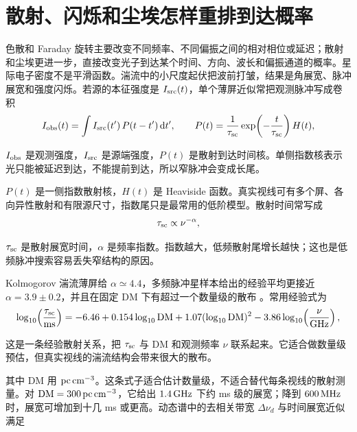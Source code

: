 \section{散射、闪烁和尘埃怎样重排到达概率}

色散和 Faraday 旋转主要改变不同频率、不同偏振之间的相对相位或延迟；散射和尘埃更进一步，直接改变光子到达某个时间、方向、波长和偏振通道的概率。星际电子密度不是平滑函数。湍流中的小尺度起伏把波前打皱，结果是角展宽、脉冲展宽和强度闪烁。若源的本征强度是 \(I_{\rm src}(t)\)，单个薄屏近似常把观测脉冲写成卷积
\begin{equation}
  I_{\rm obs}(t)
  =
  \int I_{\rm src}(t')\,P(t-t')\,{\rm d}t',
  \qquad
  P(t)=\frac{1}{\tau_{\rm sc}}\exp\!\left(-\frac{t}{\tau_{\rm sc}}\right)H(t),
  \label{eq:ch14-scattering-convolution}
\end{equation}
\begin{formulaexplain}[公式 (14.12) 解读]
\(I_{\rm obs}\) 是观测强度，\(I_{\rm src}\) 是源端强度，\(P(t)\) 是散射到达时间核。单侧指数核表示光只能被延迟到达，不能提前到达，所以窄脉冲会变成长尾。
\end{formulaexplain}
\(P(t)\) 是一侧指数散射核，\(H(t)\) 是 Heaviside 函数。真实视线可有多个屏、各向异性散射和有限源尺寸，指数尾只是最常用的低阶模型。散射时间常写成
\begin{equation}
  \tau_{\rm sc}\propto \nu^{-\alpha},
  \label{eq:ch14-scattering-power}
\end{equation}
\begin{formulaexplain}[公式 (14.13) 解读]
\(\tau_{\rm sc}\) 是散射展宽时间，\(\alpha\) 是频率指数。指数越大，低频散射尾增长越快；这也是低频脉冲搜索容易丢失窄结构的原因。
\end{formulaexplain}
Kolmogorov 湍流薄屏给 \(\alpha\simeq4.4\)，多频脉冲星样本给出的经验平均更接近 \(\alpha=3.9\pm0.2\)，并且在固定 DM 下有超过一个数量级的散布 \citep{1977ARA&A..15..479R,1990ARA&A..28..561R,1995ApJ...443..209A,2004ApJ...605..759B}。常用经验式为
\begin{equation}
  \log_{10}\!\left(\frac{\tau_{\rm sc}}{{\rm ms}}\right)
  =
  -6.46
  +0.154\log_{10}{\rm DM}
  +1.07(\log_{10}{\rm DM})^2
  -3.86\log_{10}\!\left(\frac{\nu}{\rm GHz}\right),
  \label{eq:ch14-bhat-scattering}
\end{equation}
\begin{formulaexplain}[公式 (14.14) 解读]
这是一条经验散射关系，把 \(\tau_{\rm sc}\) 与 DM 和观测频率 \(\nu\) 联系起来。它适合做数量级预估，但真实视线的湍流结构会带来很大的散布。
\end{formulaexplain}
其中 DM 用 \({\rm pc\,cm^{-3}}\)。这条式子适合估计数量级，不适合替代每条视线的散射测量。对 \({\rm DM}=300\,{\rm pc\,cm^{-3}}\)，它给出 \(1.4\,{\rm GHz}\) 下约 ms 级的展宽；降到 \(600\,{\rm MHz}\) 时，展宽可增加到十几 ms 或更高。动态谱中的去相关带宽 \(\Delta\nu_d\) 与时间展宽近似满足
